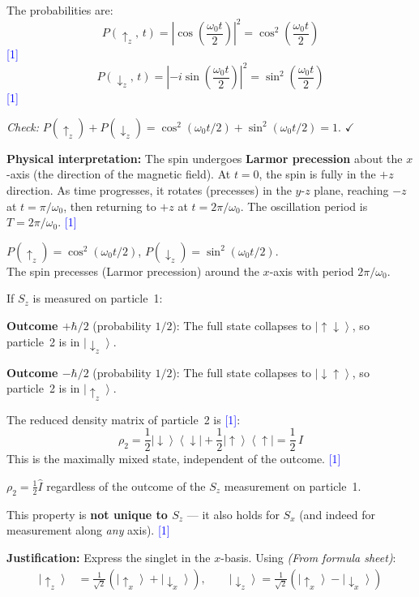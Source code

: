 \documentclass[12pt,a4paper]{article}
\newcommand{\markstep}[1]{\hfill\textcolor{blue}{[#1]}}
\newcommand{\finalanswer}[1]{%
  \begin{tcolorbox}[colback=green!5!white,colframe=green!50!black,boxrule=0.5pt]
  #1
  \end{tcolorbox}
}
\newcommand{\fromsheet}{\textit{(From formula sheet)}}
\renewcommand{\ket}[1]{\left|#1\right\rangle}
\renewcommand{\ketbra}[2]{\left|#1\right\rangle\!\left\langle #2\right|}
\begin{document}
\begin{parts}
\item The probabilities are:
\[
P(\uparrow_z,\,t) = \left|\cos\!\left(\frac{\omega_0 t}{2}\right)\right|^2 = \cos^2\!\left(\frac{\omega_0 t}{2}\right)
\]
\markstep{1}
\[
P(\downarrow_z,\,t) = \left|-i\sin\!\left(\frac{\omega_0 t}{2}\right)\right|^2 = \sin^2\!\left(\frac{\omega_0 t}{2}\right)
\]
\markstep{1}

\textit{Check:} $P(\uparrow_z) + P(\downarrow_z) = \cos^2(\omega_0 t/2) + \sin^2(\omega_0 t/2) = 1$. $\checkmark$

\textbf{Physical interpretation:} The spin undergoes \textbf{Larmor precession} about the $x$-axis (the direction of the magnetic field). At $t = 0$, the spin is fully in the $+z$ direction. As time progresses, it rotates (precesses) in the $y$-$z$ plane, reaching $-z$ at $t = \pi/\omega_0$, then returning to $+z$ at $t = 2\pi/\omega_0$. The oscillation period is $T = 2\pi/\omega_0$. \markstep{1}

\finalanswer{$P(\uparrow_z) = \cos^2(\omega_0 t/2)$, \quad $P(\downarrow_z) = \sin^2(\omega_0 t/2)$.\\
The spin precesses (Larmor precession) around the $x$-axis with period $2\pi/\omega_0$.}

\item
\begin{parts}
\item If $S_z$ is measured on particle~1:

\textbf{Outcome $+\hbar/2$} (probability $1/2$): The full state collapses to $\ket{\!\uparrow\downarrow}$, so particle~2 is in $\ket{\!\downarrow_z}$.

\textbf{Outcome $-\hbar/2$} (probability $1/2$): The full state collapses to $\ket{\!\downarrow\uparrow}$, so particle~2 is in $\ket{\!\uparrow_z}$.

The reduced density matrix of particle~2 is \markstep{1}:
\[
\rho_2 = \frac{1}{2}\ketbra{\!\downarrow}{\downarrow\!} + \frac{1}{2}\ketbra{\!\uparrow}{\uparrow\!} = \frac{1}{2}\,\hat{I}
\]
This is the maximally mixed state, independent of the outcome. \markstep{1}

\finalanswer{$\rho_2 = \tfrac{1}{2}\hat{I}$ regardless of the outcome of the $S_z$ measurement on particle~1.}

\item This property is \textbf{not unique to $S_z$} --- it also holds for $S_x$ (and indeed for measurement along \emph{any} axis). \markstep{1}

\textbf{Justification:} Express the singlet in the $x$-basis. Using \fromsheet:
\begin{align*}
\ket{\!\uparrow_z} &= \frac{1}{\sqrt{2}}(\ket{\!\uparrow_x}+\ket{\!\downarrow_x}), \qquad \ket{\!\downarrow_z} = \frac{1}{\sqrt{2}}(\ket{\!\uparrow_x}-\ket{\!\downarrow_x})
\end{align*}


\end{parts}
\end{parts}
\end{document}
